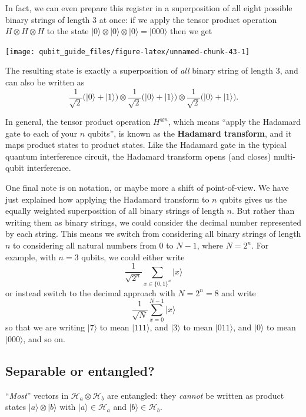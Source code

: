 \documentclass[fleqn,a4paper]{article}
\newenvironment{idea}{\everypar{\setlength{\parindent}{1.5em}}}{}
\theoremstyle{definition}
\theoremstyle{definition}
\theoremstyle{definition}
\theoremstyle{definition}
\theoremstyle{remark}
\begin{document}
In fact, we can even prepare this register in a superposition of all eight possible binary strings of length 3 at once: if we apply the tensor product operation \(H\otimes H\otimes H\) to the state \(|0\rangle\otimes|0\rangle\otimes|0\rangle = |000\rangle\) then we get

\begin{center}\texttt{[image: qubit\_guide\_files/figure-latex/unnamed-chunk-43-1]} \end{center}

The resulting state is exactly a superposition of \emph{all} binary string of length 3, and can also be written as
\[
  \frac{1}{\sqrt{2}} \big(|0\rangle + |1\rangle\big)
  \otimes
  \frac{1}{\sqrt{2}} \big(|0\rangle + |1\rangle\big)
  \otimes
  \frac{1}{\sqrt{2}} \big(|0\rangle + |1\rangle\big).
\]

In general, the tensor product operation \(H^{\otimes n}\), which means ``apply the Hadamard gate to each of your \(n\) qubits'', is known as the \textbf{Hadamard transform}, and it maps product states to product states.
Like the Hadamard gate in the typical quantum interference circuit, the Hadamard transform opens (and closes) multi-qubit interference.

One final note is on notation, or maybe more a shift of point-of-view.
We have just explained how applying the Hadamard transform to \(n\) qubits gives us the equally weighted superposition of all binary strings of length \(n\).
But rather than writing them as binary strings, we could consider the decimal number represented by each string.
This means we switch from considering all binary strings of length \(n\) to considering all natural numbers from \(0\) to \(N-1\), where \(N=2^n\).
For example, with \(n=3\) qubits, we could either write
\[
  \frac{1}{\sqrt{2^n}} \sum_{x\in\{0,1\}^n} |x\rangle
\]
or instead switch to the decimal approach with \(N=2^n=8\) and write
\[
  \frac{1}{\sqrt{N}} \sum_{x=0}^{N-1} |x\rangle
\]
so that we are writing \(|7\rangle\) to mean \(|111\rangle\), and \(|3\rangle\) to mean \(|011\rangle\), and \(|0\rangle\) to mean \(|000\rangle\), and so on.

\hypertarget{separable-or-entangled}{%
\subsection{Separable or entangled?}\label{separable-or-entangled}}

\begin{idea}
``\emph{Most}'' vectors in \(\mathcal{H}_a\otimes \mathcal{H}_b\) are entangled: they \emph{cannot} be written as product states \(|a\rangle\otimes|b\rangle\) with \(|a\rangle\in\mathcal{H}_a\) and \(|b\rangle\in\mathcal{H}_b\).

\end{idea}
\end{document}
